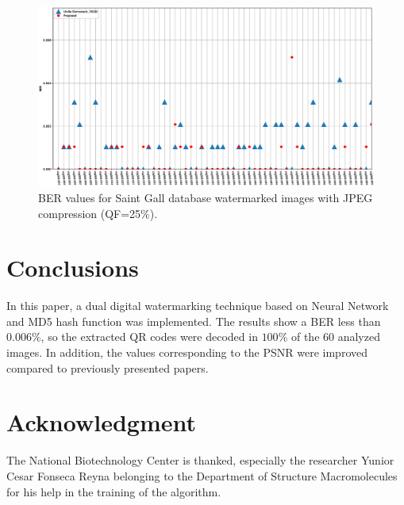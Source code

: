 \documentclass[runningheads]{llncs}
\begin{document}
\begin{figure}[H]	%
	\begin{center}
		\includegraphics[width=\textwidth]{ber25.eps}
	\end{center}
	\caption{BER values for Saint Gall database watermarked images with JPEG compression (QF=25\%).}
	\label{ber20}
\end{figure}

\section{Conclusions}
In this paper, a dual digital watermarking technique based on Neural Network and MD5 hash function was implemented. The results show a BER less than $0.006 \%$, so the extracted QR codes were decoded in $100\%$ of the $60$ analyzed images. In addition, the values corresponding to the PSNR were improved compared to previously presented papers.

\section{Acknowledgment}
The National Biotechnology Center is thanked, especially the researcher Yunior Cesar Fonseca Reyna belonging to the Department of Structure Macromolecules for his help in the training of the algorithm.
%
%
%


%
\end{document}
